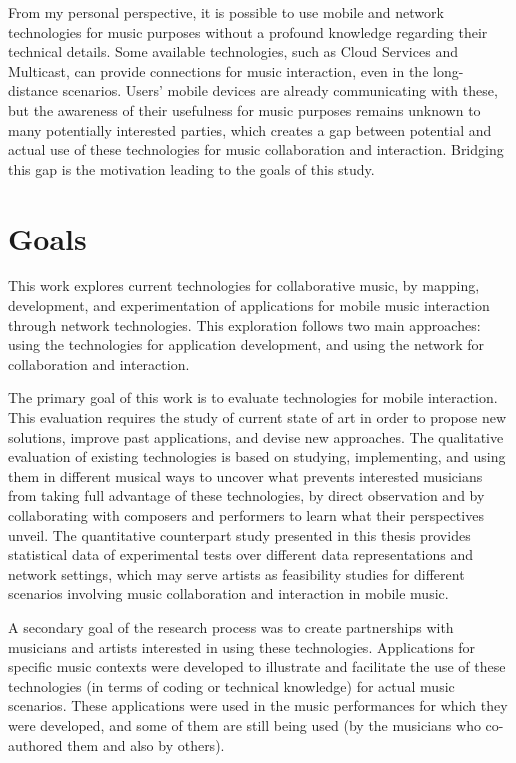 From my personal perspective, it is possible to use mobile and network technologies for music purposes without a profound knowledge regarding their technical details. 
Some available technologies, such as Cloud Services and Multicast, can provide connections for music interaction, even in the long-distance scenarios. 
Users' mobile devices are already communicating with these, but the awareness of their usefulness for music purposes remains unknown to many potentially interested parties, which creates a gap between potential and actual use of these technologies for music collaboration and interaction. 
Bridging this gap is the motivation leading to the goals of this study.

\section{Goals}

This work explores current technologies for collaborative music, by mapping, development, and experimentation of applications for mobile music interaction through network technologies.
This exploration follows two main approaches: using the technologies for application development, and using the network for collaboration and interaction.

The primary goal of this work is to evaluate technologies for mobile interaction.
This evaluation requires the study of current state of art in order to propose new solutions, improve past applications, and devise new approaches.
The qualitative evaluation of existing technologies is based on studying, implementing, and using them in different musical ways to uncover what prevents interested musicians from taking full advantage of these technologies, by direct observation and by collaborating with composers and performers to learn what their perspectives unveil.
The quantitative counterpart study presented in this thesis provides statistical data of experimental tests over different data representations and network settings, which may serve artists as feasibility studies for different scenarios involving music collaboration and interaction in mobile music.

A secondary goal of the research process was to create partnerships with musicians and artists interested in using these technologies.
Applications for specific music contexts were developed to illustrate and facilitate the use of these technologies (in terms of coding or technical knowledge) for actual music scenarios.
These applications were used in the music performances for which they were developed, and some of them are still being used (by the musicians who co-authored them and also by others).

